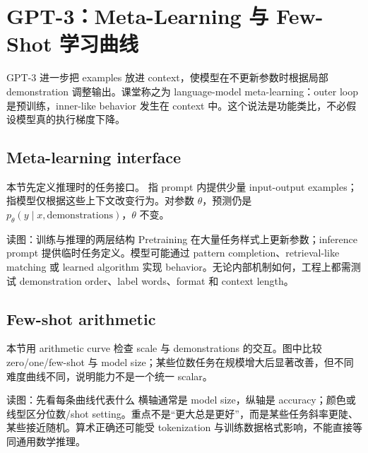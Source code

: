 \section{GPT-3：Meta-Learning 与 Few-Shot 学习曲线}

GPT-3 进一步把 examples 放进 context，使模型在不更新参数时根据局部 demonstration 调整输出。课堂称之为 language-model meta-learning：outer loop 是预训练，inner-like behavior 发生在 context 中。这个说法是功能类比，不必假设模型真的执行梯度下降。

\subsection{Meta-learning interface}

本节先定义推理时的任务接口。 指 prompt 内提供少量 input-output examples； 指模型仅根据这些上下文改变行为。对参数 $\theta$，预测仍是 $p_\theta(y\mid x,\text{demonstrations})$，$\theta$ 不变。


\begin{knowledgebox}{读图：训练与推理的两层结构}
Pretraining 在大量任务样式上更新参数；inference prompt 提供临时任务定义。模型可能通过 pattern completion、retrieval-like matching 或 learned algorithm 实现 behavior。无论内部机制如何，工程上都需测试 demonstration order、label words、format 和 context length。
\end{knowledgebox}

\subsection{Few-shot arithmetic}

本节用 arithmetic curve 检查 scale 与 demonstrations 的交互。图中比较 zero/one/few-shot 与 model size；某些位数任务在规模增大后显著改善，但不同难度曲线不同，说明能力不是一个统一 scalar。


\begin{knowledgebox}{读图：先看每条曲线代表什么}
横轴通常是 model size，纵轴是 accuracy；颜色或线型区分位数/shot setting。重点不是“更大总是更好”，而是某些任务斜率更陡、某些接近随机。算术正确还可能受 tokenization 与训练数据格式影响，不能直接等同通用数学推理。
\end{knowledgebox}

